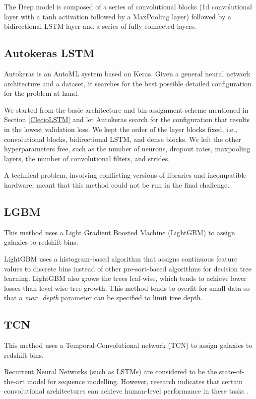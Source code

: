 \documentclass[twocolumn,twocolappendix]{aastex63}
\begin{document}
The Deep model is composed of a series of convolutional blocks (1d
convolutional layer with a tanh activation followed by a MaxPooling layer) followed by a
bidirectional LSTM layer and a series of fully connected layers. 

\subsection{ {\sc Autokeras LSTM}}
Autokeras \citep{autokeras} is an AutoML system based on Keras. Given a general neural network
architecture and a dataset, it searches for the best possible detailed configuration for the problem
at hand. 
 
We started from the basic architecture and bin assignment scheme mentioned in Section
\ref{ClecioLSTM} and let Autokeras search for the configuration that results in the lowest
validation loss. We kept the order of the layer blocks fixed, i.e., convolutional blocks,
bidirectional LSTM, and dense blocks. We left the other hyperparameters free, such as the number of
neurons,  dropout rates, maxpooling layers, the number of convolutional filters, and strides.

A technical problem, involving conflicting versions of libraries and incompatible hardware,
meant that this method could not be run in the final challenge.


\subsection{ {\sc LGBM} }
This method uses a Light Gradient Boosted Machine (LightGBM) \citep{lgbm} to assign galaxies to
redshift bins.
 
LightGBM uses a histogram-based algorithm that assigns continuous feature values to discrete bins
instead of other pre-sort-based algorithms for decision tree learning. LightGBM also grows the trees
leaf-wise, which tends to achieve lower losses than level-wise tree growth. This method tends to
overfit for small data so that a \textit{max\_depth} parameter can be specified to limit tree depth.

 
 
\subsection{ {\sc TCN}}
This method uses a Temporal-Convolutional network (TCN) \citep{baitcn} to assign galaxies to redshift
bins.
 
Recurrent Neural Networks (such as LSTMs) are considered to be the state-of-the-art model for
sequence modelling. However, research indicates that certain convolutional architectures can achieve
human-level performance in these tasks \citep{dauphin}.
 
\end{document}
